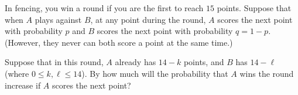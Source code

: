 In fencing, you win a round if you are the first to reach $15$ points. Suppose that when $A$ plays against $B$, at any point during the round, $A$ scores the next point with probability $p$ and $B$ scores the next point with probability $q=1-p$. (However, they never can both score a point at the same time.)

Suppose that in this round, $A$ already has $14-k$ points, and $B$ has $14-\ell$ (where $0\le k,\ell\le 14$). By how much will the probability that $A$ wins the round increase if $A$ scores the next point?